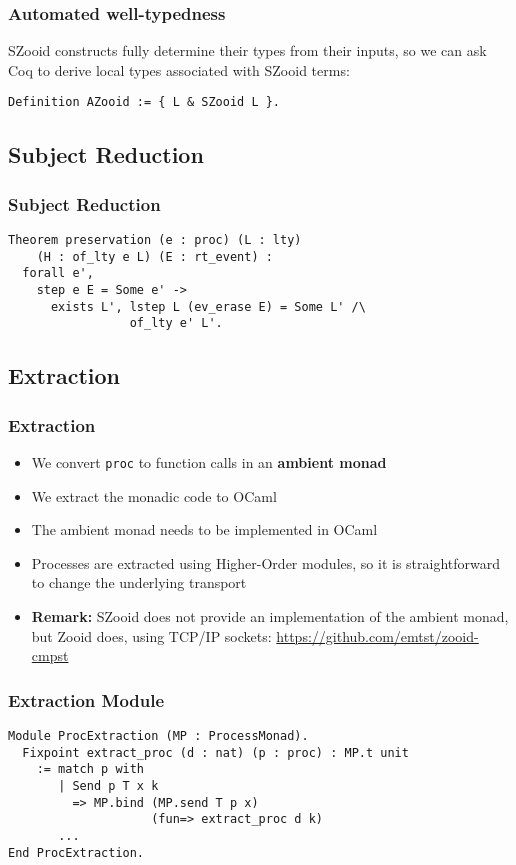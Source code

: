 \begin{frame}[fragile]
    \frametitle{Automated well-typedness}
    SZooid constructs fully determine their types from their inputs, so we can
    ask Coq to derive local types associated with SZooid terms:
\vspace{1cm}
\begin{verbatim}
Definition AZooid := { L & SZooid L }.
\end{verbatim}
\end{frame}

\subsection{Subject Reduction}

\begin{frame}
\frametitle{Subject Reduction}
\begin{verbatim}
Theorem preservation (e : proc) (L : lty) 
    (H : of_lty e L) (E : rt_event) :
  forall e',
    step e E = Some e' ->
      exists L', lstep L (ev_erase E) = Some L' /\
                 of_lty e' L'.
\end{verbatim}
\end{frame}

\subsection{Extraction}

\begin{frame}
\frametitle{Extraction}
\begin{itemize}
\item We convert \verb|proc| to function calls in an \textbf{ambient monad}
\item We extract the monadic code to OCaml
\item The ambient monad needs to be implemented in OCaml
\item Processes are extracted using Higher-Order modules, so it is straightforward to change the underlying
transport
\vspace{.2cm}
\item \textbf{Remark:} SZooid does not provide an implementation of the ambient monad, but Zooid does, using TCP/IP sockets: 
\url{https://github.com/emtst/zooid-cmpst}
\end{itemize}
\end{frame}

\begin{frame}
\frametitle{Extraction Module}
\begin{verbatim}
Module ProcExtraction (MP : ProcessMonad).
  Fixpoint extract_proc (d : nat) (p : proc) : MP.t unit 
    := match p with
       | Send p T x k
         => MP.bind (MP.send T p x)
                    (fun=> extract_proc d k)
       ...
End ProcExtraction.
\end{verbatim}
\end{frame}

